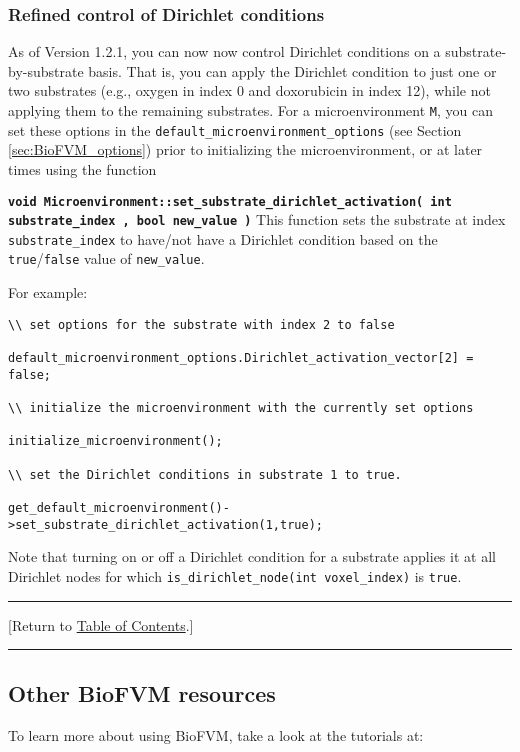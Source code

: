 \documentclass[12pt]{article}
\renewcommand{\v}{\verb}
\newcommand{\smallcode}[1]{\textbf{\texttt{#1}}}
\newcommand{\TOClink}{\begin{center}\hrule\vskip-10pt\phantom{.}\hfill[Return to \hyperlink{TOC}{Table of Contents}.]\hfill\phantom{.}\vskip3pt\hrule\end{center}}
\begin{document}
\subsubsection{Refined control of Dirichlet conditions}
\label{sec:refined_Dirichlet_conditions}

As of Version 1.2.1, you can now now control Dirichlet conditions on a 
substrate-by-substrate basis. That is, you can apply the Dirichlet condition to just one or two 
substrates (e.g., oxygen in index 0 and doxorubicin in index 12), while not applying them 
to the remaining substrates. For a microenvironment \v|M|, you can set these options 
in the \v|default_microenvironment_options| (see Section \ref{sec:BioFVM_options}) prior to initializing 
the microenvironment, or at later times using the function 

\smallcode{void Microenvironment::set\_substrate\_dirichlet\_activation( int substrate\_index , bool new\_value )} 
This function sets the substrate at index \v|substrate_index| to have/not have a Dirichlet condition 
based on the \v|true|/\v|false| value of \v|new_value|.


For example: 
\begin{verbatim}
\\ set options for the substrate with index 2 to false 

default_microenvironment_options.Dirichlet_activation_vector[2] = false; 

\\ initialize the microenvironment with the currently set options 

initialize_microenvironment(); 

\\ set the Dirichlet conditions in substrate 1 to true. 

get_default_microenvironment()->set_substrate_dirichlet_activation(1,true); 
\end{verbatim}

Note that turning on or off a Dirichlet condition for a substrate applies it at all Dirichlet nodes for 
which \v|is_dirichlet_node(int voxel_index)| is \v|true|. 

\TOClink

\subsection{Other BioFVM resources}
\label{sec:BioFVM_further_reading}
To learn more about using BioFVM, take a look at the tutorials at: 
\end{document}
